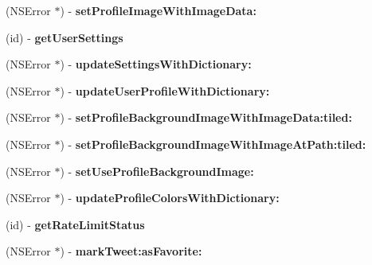 \begin{DoxyCompactItemize}
(N\+S\+Error $\ast$) -\/ {\bfseries set\+Profile\+Image\+With\+Image\+Data\+:}
\item 
\mbox{\label{interfaceFHSTwitterEngine_a0fff0558ecb7e2735af0a173f9140da2}} 
(id) -\/ {\bfseries get\+User\+Settings}
\item 
\mbox{\label{interfaceFHSTwitterEngine_a83791ba76a8508425dcae40381f4196c}} 
(N\+S\+Error $\ast$) -\/ {\bfseries update\+Settings\+With\+Dictionary\+:}
\item 
\mbox{\label{interfaceFHSTwitterEngine_a3b685fa1be3d18f468c59b2a39085b65}} 
(N\+S\+Error $\ast$) -\/ {\bfseries update\+User\+Profile\+With\+Dictionary\+:}
\item 
\mbox{\label{interfaceFHSTwitterEngine_a1e3e83e2abecec4fa517aee3aea8886c}} 
(N\+S\+Error $\ast$) -\/ {\bfseries set\+Profile\+Background\+Image\+With\+Image\+Data\+:tiled\+:}
\item 
\mbox{\label{interfaceFHSTwitterEngine_abed298cc22158b1b168835f8387d2e44}} 
(N\+S\+Error $\ast$) -\/ {\bfseries set\+Profile\+Background\+Image\+With\+Image\+At\+Path\+:tiled\+:}
\item 
\mbox{\label{interfaceFHSTwitterEngine_a2d7094a7d55955fc62aebe7c1445382d}} 
(N\+S\+Error $\ast$) -\/ {\bfseries set\+Use\+Profile\+Background\+Image\+:}
\item 
\mbox{\label{interfaceFHSTwitterEngine_aa43d623260d2fba1d9e6c57e2e98e29f}} 
(N\+S\+Error $\ast$) -\/ {\bfseries update\+Profile\+Colors\+With\+Dictionary\+:}
\item 
\mbox{\label{interfaceFHSTwitterEngine_a74b9ae0794253675bbd97365443db196}} 
(id) -\/ {\bfseries get\+Rate\+Limit\+Status}
\item 
\mbox{\label{interfaceFHSTwitterEngine_a6a2eb54fa2561757244c81d7e5e1b359}} 
(N\+S\+Error $\ast$) -\/ {\bfseries mark\+Tweet\+:as\+Favorite\+:}
\item 
\mbox{\label{interfaceFHSTwitterEngine_a4c2adc59dbf80b301e98f0695da40001}} 

\end{DoxyCompactItemize}
